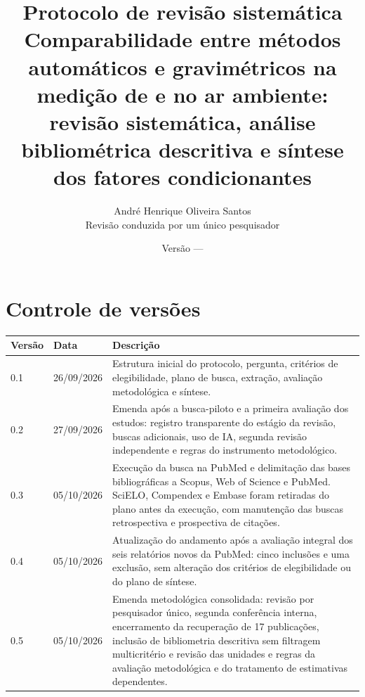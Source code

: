 \documentclass[11pt,a4paper]{article}
\title{\textbf{Protocolo de revisão sistemática}\\[0.6em]
\large Comparabilidade entre métodos automáticos e gravimétricos na medição de
\MPdez{} e \MPdoiscinco{} no ar ambiente: revisão sistemática, análise
bibliométrica descritiva e síntese dos fatores condicionantes}
\author{André Henrique Oliveira Santos\\
\small Revisão conduzida por um único pesquisador}
\date{Versão \versao{} --- \dataversao}
\begin{document}
\maketitle

\begin{center}
\end{center}

\section*{Controle de versões}

\begin{tabularx}{\textwidth}{@{}p{1.5cm}p{3.2cm}X@{}}
\toprule
\textbf{Versão} & \textbf{Data} & \textbf{Descrição} \\
\midrule
0.1 & 26/09/2026 & Estrutura inicial do protocolo, pergunta, critérios de
elegibilidade, plano de busca, extração, avaliação metodológica e síntese. \\
0.2 & 27/09/2026 & Emenda após a busca-piloto e a primeira avaliação dos estudos:
registro transparente do estágio da revisão, buscas adicionais, uso de IA, segunda
revisão independente e regras do instrumento metodológico. \\
0.3 & 05/10/2026 & Execução da busca na PubMed e delimitação das bases bibliográficas
a Scopus, Web of Science e PubMed. SciELO, Compendex e Embase foram retiradas do plano
antes da execução, com manutenção das buscas retrospectiva e prospectiva de citações. \\
0.4 & 05/10/2026 & Atualização do andamento após a avaliação integral dos seis
relatórios novos da PubMed: cinco inclusões e uma exclusão, sem alteração dos
critérios de elegibilidade ou do plano de síntese. \\
0.5 & 05/10/2026 & Emenda metodológica consolidada: revisão por pesquisador único,
segunda conferência interna, encerramento da recuperação de 17 publicações, inclusão
de bibliometria descritiva sem filtragem multicritério e revisão das unidades e regras
da avaliação metodológica e do tratamento de estimativas dependentes. \\
\bottomrule
\end{tabularx}
\end{document}
